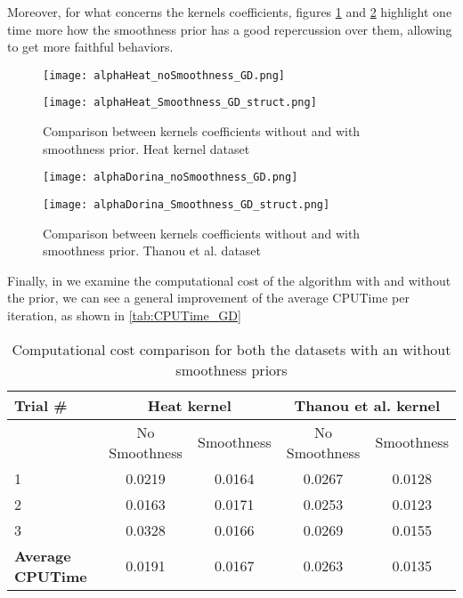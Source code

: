 Moreover, for what concerns the kernels coefficients, figures \ref{fig:alphaGDHeat} and \ref{fig:alphaGDDorina} highlight one time more how the smoothness prior has a good repercussion over them, allowing to get more faithful behaviors.

\begin{figure}
  \centering
  \begin{minipage}[c]{.8\textwidth}
    \centering
    \texttt{[image: alphaHeat\_noSmoothness\_GD.png]}
  \end{minipage}
  \begin{minipage}[c]{.8\textwidth}
    \centering
    \texttt{[image: alphaHeat\_Smoothness\_GD\_struct.png]}
  \end{minipage}
  \caption{Comparison between kernels coefficients without and with smoothness prior. Heat kernel   dataset}
  \label{fig:alphaGDHeat}
\end{figure}

\begin{figure}
  \centering
  \begin{minipage}[c]{.8\textwidth}
    \centering
    \texttt{[image: alphaDorina\_noSmoothness\_GD.png]}
  \end{minipage}
  \begin{minipage}[c]{.8\textwidth}
    \centering
    \texttt{[image: alphaDorina\_Smoothness\_GD\_struct.png]}
  \end{minipage}
  \caption{Comparison between kernels coefficients without and with smoothness prior. Thanou et al.   dataset}
  \label{fig:alphaGDDorina}
\end{figure}

Finally, in we examine the computational cost of the algorithm with and without the prior, we can see a general improvement of the average CPUTime per iteration, as shown in \autoref{tab:CPUTime_GD}

\begin{table}[htbp]
  \centering
  \begin{tabular}{lcccc}
  \textbf{Trial \#} &\multicolumn{2}{c}{\textbf{Heat kernel}}&\multicolumn{2}{c}{\textbf{Thanou et al. kernel}}\\
  \toprule
  & No Smoothness & Smoothness & No Smoothness & Smoothness\\ %
  \midrule
    1 & 0.0219 & 0.0164 & 0.0267 & 0.0128\\
    2 & 0.0163 & 0.0171 & 0.0253 & 0.0123\\
    3 & 0.0328 & 0.0166 & 0.0269 & 0.0155\\
    \textbf{Average CPUTime} & 0.0191 & 0.0167 & 0.0263 & 0.0135 \\
    \bottomrule
  \end{tabular}
  \caption{Computational cost comparison for both the datasets with an without smoothness priors}
  \label{tab:CPUTime_GD}
\end{table}
